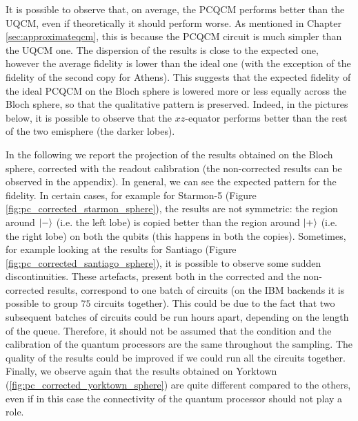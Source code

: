 It is possible to observe that, on average, the PCQCM performs better than the UQCM, even if theoretically it should perform worse. 
As mentioned in Chapter \ref{sec:approximateqcm}, this is because the PCQCM circuit is much simpler than the UQCM one.
The dispersion of the results is close to the expected one, however the average fidelity is lower than the ideal one (with the exception of the fidelity of the second copy for Athens).
This suggests that the expected fidelity of the ideal PCQCM on the Bloch sphere is lowered more or less equally across the Bloch sphere, so that the qualitative pattern is preserved.
Indeed, in the pictures below, it is possible to observe that the $xz$-equator performs better than the rest of the two emisphere (the darker lobes).

In the following we report the projection of the results obtained on the Bloch sphere, corrected with the readout calibration (the non-corrected results can be observed in the appendix). 
In general, we can see the expected pattern for the fidelity.
In certain cases, for example for Starmon-5 (Figure \ref{fig:pc_corrected_starmon_sphere}), the results are not symmetric: the region around $\ket{-}$ (i.e. the left lobe) is copied better than the region around $\ket{+}$ (i.e. the right lobe) on both the qubits (this happens in both the copies).
Sometimes, for example looking at the results for Santiago (Figure \ref{fig:pc_corrected_santiago_sphere}), it is possible to observe some sudden discontinuities.
These artefacts, present both in the corrected and the non-corrected results, correspond to one batch of circuits (on the IBM backends it is possible to group $75$ circuits together).
This could be due to the fact that two subsequent batches of circuits could be run hours apart, depending on the length of the queue.
Therefore, it should not be assumed that the condition and the calibration of the quantum processors are the same throughout the sampling.
The quality of the results could be improved if we could run all the circuits together.
Finally, we observe again that the results obtained on Yorktown (\ref{fig:pc_corrected_yorktown_sphere}) are quite different compared to the others, even if in this case the connectivity of the quantum processor should not play a role.


